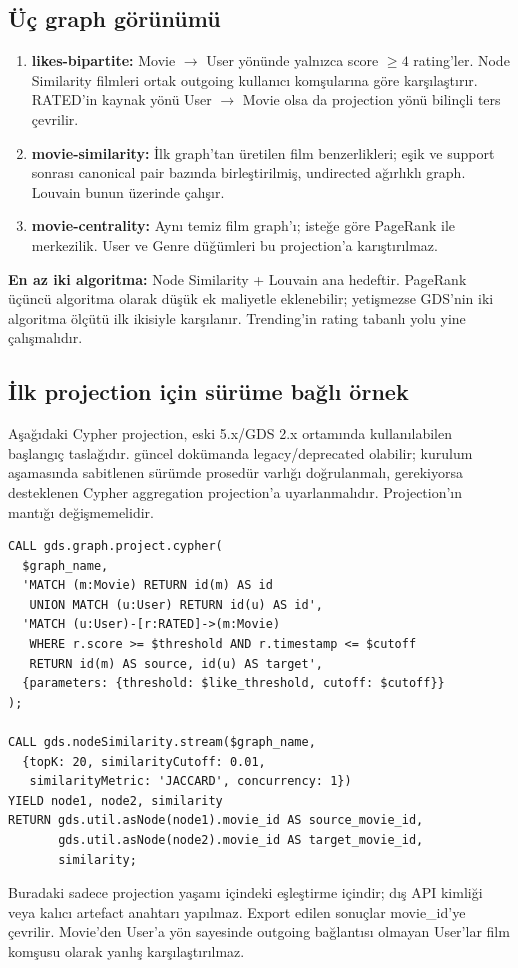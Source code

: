 \documentclass[11pt,a4paper]{article}
\newcommand{\code}[1]{\texttt{\detokenize{#1}}}
\begin{document}
\subsection{Üç graph görünümü}
\begin{enumerate}
\item \textbf{likes-bipartite:} Movie $\to$ User yönünde yalnızca score $\geq4$ rating'ler. Node Similarity filmleri ortak outgoing kullanıcı komşularına göre karşılaştırır. RATED'in kaynak yönü User $\to$ Movie olsa da projection yönü bilinçli ters çevrilir.
\item \textbf{movie-similarity:} İlk graph'tan üretilen film benzerlikleri; eşik ve support sonrası canonical pair bazında birleştirilmiş, undirected ağırlıklı graph. Louvain bunun üzerinde çalışır.
\item \textbf{movie-centrality:} Aynı temiz film graph'ı; isteğe göre PageRank ile merkezilik. User ve Genre düğümleri bu projection'a karıştırılmaz.
\end{enumerate}

\textbf{En az iki algoritma:} Node Similarity + Louvain ana hedeftir. PageRank üçüncü algoritma olarak düşük ek maliyetle eklenebilir; yetişmezse GDS'nin iki algoritma ölçütü ilk ikisiyle karşılanır. Trending'in rating tabanlı yolu yine çalışmalıdır.

\subsection{İlk projection için sürüme bağlı örnek}
Aşağıdaki Cypher projection, eski 5.x/GDS 2.x ortamında kullanılabilen başlangıç taslağıdır. \code{gds.graph.project.cypher} güncel dokümanda legacy/deprecated olabilir; kurulum aşamasında sabitlenen sürümde prosedür varlığı doğrulanmalı, gerekiyorsa desteklenen Cypher aggregation projection'a uyarlanmalıdır. Projection'ın mantığı değişmemelidir.
\begin{lstlisting}
CALL gds.graph.project.cypher(
  $graph_name,
  'MATCH (m:Movie) RETURN id(m) AS id
   UNION MATCH (u:User) RETURN id(u) AS id',
  'MATCH (u:User)-[r:RATED]->(m:Movie)
   WHERE r.score >= $threshold AND r.timestamp <= $cutoff
   RETURN id(m) AS source, id(u) AS target',
  {parameters: {threshold: $like_threshold, cutoff: $cutoff}}
);

CALL gds.nodeSimilarity.stream($graph_name,
  {topK: 20, similarityCutoff: 0.01,
   similarityMetric: 'JACCARD', concurrency: 1})
YIELD node1, node2, similarity
RETURN gds.util.asNode(node1).movie_id AS source_movie_id,
       gds.util.asNode(node2).movie_id AS target_movie_id,
       similarity;
\end{lstlisting}
Buradaki \code{id()} sadece projection yaşamı içindeki eşleştirme içindir; dış API kimliği veya kalıcı artefact anahtarı yapılmaz. Export edilen sonuçlar movie\_id'ye çevrilir. Movie'den User'a yön sayesinde outgoing bağlantısı olmayan User'lar film komşusu olarak yanlış karşılaştırılmaz.
\end{document}
